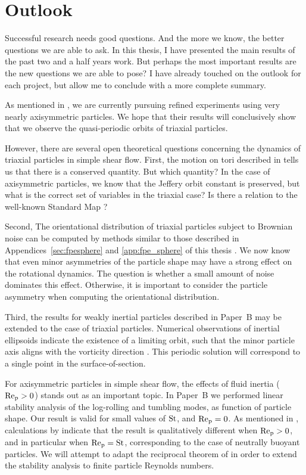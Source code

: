 \documentclass[thesis.tex]{subfiles}
\begin{document}
\chapter{Outlook}
Successful research needs good questions. And the more we know, the better questions we are able to ask.
In this thesis, I have presented the main results of the past two and a half years work. But perhaps the most important results are the new questions we are able to pose? I have already touched on the outlook for each project, but allow me to conclude with a more complete summary.

As mentioned in , we are currently pursuing refined experiments using very nearly axisymmetric particles. We hope that their results will conclusively show that we observe the quasi-periodic orbits of triaxial particles.

However, there are several open theoretical questions concerning the dynamics of triaxial particles in simple shear flow. 
First, the motion on tori described in  tells us that there is a conserved quantity. But which quantity? In the case of axisymmetric particles, we know that the Jeffery orbit constant is preserved, but what is the correct set of variables in the triaxial case? Is there a relation to the well-known Standard Map \cite{ott2002, strogatz2000}? 

Second, The orientational distribution of triaxial particles subject to Brownian noise can be computed by methods similar to those described in Appendices~\ref{sec:fpesphere} and \ref{app:fpe_sphere} of this thesis \cite{favro1960,brenner1972,hubbard1972}. We now know that even minor asymmetries of the particle shape may have a strong effect on the rotational dynamics. The question is whether a small amount of noise dominates this effect. Otherwise, it is important to consider the particle asymmetry when computing the orientational distribution.

Third, the results for weakly inertial particles described in Paper~B may be extended to the case of triaxial particles. Numerical observations of inertial ellipsoids indicate the existence of a limiting orbit, such that the minor particle axis aligns with the vorticity direction \cite{lundell2011}. This periodic solution will correspond to a single point in the surface-of-section.

For axisymmetric particles in simple shear flow, the effects of fluid inertia ($\mbox{Re}_{\mathrm p}>0$) stands out as an important topic. In Paper~B we performed linear stability analysis of the log-rolling and tumbling modes, as function of particle shape. Our result is valid for small values of $\mbox{St}$, and $\mbox{Re}_{\mathrm p} =0$. As mentioned in , calculations by  indicate that the result is qualitatively different when $\mbox{Re}_{\mathrm p}>0$, and in particular when $\mbox{Re}_{\mathrm p}=\mbox{St}$, corresponding to the case of neutrally buoyant particles. We will attempt to adapt the reciprocal theorem of \cite{lovalenti1993,subramanian2005,subramanian2006} in order to extend the stability analysis to finite particle Reynolds numbers.
\end{document}
